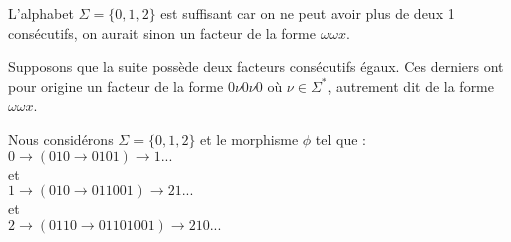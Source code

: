 \Q
L'alphabet $\Sigma=\{0,1,2\}$ est suffisant car on ne peut avoir plus de deux 1 consécutifs, on aurait sinon un facteur de la forme $\omega\omega x$.
\medskip

Supposons que la suite possède deux facteurs consécutifs égaux. Ces derniers ont pour origine un facteur de la forme $0\nu0\nu0$ où $\nu\in\Sigma^*$, autrement dit de la forme $\omega\omega x$.
\medskip

Nous considérons $\Sigma=\{0,1,2\}$ et le morphisme $\phi$ tel que :\\
$0 \rightarrow (010 \rightarrow 0101) \rightarrow 1...$\\
et\\
$1 \rightarrow (010 \rightarrow 011001) \rightarrow 21...$\\
et\\
$2 \rightarrow (0110 \rightarrow 01101001) \rightarrow 210...$
\bigskip

\Fin
